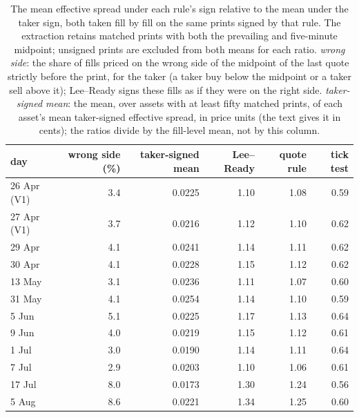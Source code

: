 \begin{table}[htbp]
\centering\footnotesize\setlength{\tabcolsep}{3.5pt}
\begin{tabular}{lrrrrr}
\toprule
day & wrong side (\%) & taker-signed mean & Lee--Ready & quote rule & tick test \\
\midrule
26 Apr (V1) & 3.4 & 0.0225 & 1.10 & 1.08 & 0.59 \\
27 Apr (V1) & 3.7 & 0.0216 & 1.12 & 1.10 & 0.62 \\
29 Apr & 4.1 & 0.0241 & 1.14 & 1.11 & 0.62 \\
30 Apr & 4.1 & 0.0228 & 1.15 & 1.12 & 0.62 \\
13 May & 3.1 & 0.0236 & 1.11 & 1.07 & 0.60 \\
31 May & 4.1 & 0.0254 & 1.14 & 1.10 & 0.59 \\
5 Jun & 5.1 & 0.0225 & 1.17 & 1.13 & 0.64 \\
9 Jun & 4.0 & 0.0219 & 1.15 & 1.12 & 0.61 \\
1 Jul & 3.0 & 0.0190 & 1.14 & 1.11 & 0.64 \\
7 Jul & 2.9 & 0.0203 & 1.10 & 1.06 & 0.61 \\
17 Jul & 8.0 & 0.0173 & 1.30 & 1.24 & 0.56 \\
5 Aug & 8.6 & 0.0221 & 1.34 & 1.25 & 0.60 \\
\bottomrule
\end{tabular}
\caption{The mean effective spread under each rule's sign relative to the mean under the taker sign, both taken fill by fill on the same prints signed by that rule. The extraction retains matched prints with both the prevailing and five-minute midpoint; unsigned prints are excluded from both means for each ratio. \emph{wrong side}: the share of fills priced on the wrong side of the midpoint of the last quote strictly before the print, for the taker (a taker buy below the midpoint or a taker sell above it); Lee--Ready signs these fills as if they were on the right side. \emph{taker-signed mean}: the mean, over assets with at least fifty matched prints, of each asset's mean taker-signed effective spread, in price units (the text gives it in cents); the ratios divide by the fill-level mean, not by this column.}
\label{tab:signed}
\end{table}
